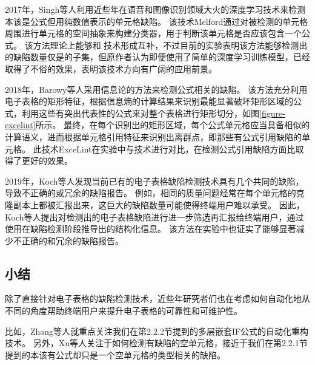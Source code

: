 

2017年，Singh等人\cite{singh2017melford}利用近些年在语音和图像识别领域大火的深度学习技术来检测本该是公式但用纯数值表示的单元格缺陷。
该技术Melford通过对被检测的单元格周围进行单元格的空间抽象来构建分类器，用于判断该单元格是否应该包含一个公式。
该方法理论上能够和 \cu 技术形成互补，不过目前的实验表明该方法能够检测出的缺陷数量仅是\cu 的子集，但原作者认为即便使用了简单的深度学习训练模型，已经取得了不俗的效果，表明该技术方向有广阔的应用前景。

2018年，Barowy等人\cite{Barowy2018excelint}采用信息论的方法来检测公式相关的缺陷。
该方法充分利用电子表格的矩形特征，根据信息熵的计算结果来识别最能显著破坏矩形区域的公式，利用这些有突出代表性的公式来对整个表格进行矩形切分，如图\ref{figure-excelint}所示。
最终，在每个识别出的矩形区域，每个公式单元格应当具备相似的计算语义，进而根据单元格引用特征来识别出离群点，即那些有公式引用缺陷的单元格。
此技术ExceLint在实验中\cite{Barowy2018excelint}与\cu 技术进行对比，在检测公式引用缺陷方面比\cu 取得了更好的效果。

2019年，Koch等人\cite{koch2019refinement}发现当前已有的电子表格缺陷检测技术具有几个共同的缺陷，导致不正确的或冗余的缺陷报告。
例如，相同的质量问题经常在每个单元格的克隆副本上都被汇报出来，这巨大的缺陷数量可能使得终端用户难以承受。
因此，Koch等人提出对检测出的电子表格缺陷进行进一步筛选再汇报给终端用户，通过使用在缺陷检测阶段推导出的结构化信息。
该方法在实验中也证实了能够显著减少不正确的和冗余的缺陷报告。

\subsection{小结}
除了直接针对电子表格的缺陷检测技术，近些年研究者们也在考虑如何自动化地从不同的角度帮助终端用户来提升电子表格的可靠性和可维护性。

比如，Zhang等人\cite{zhang2018automated}就重点关注我们在第2.2.2节提到的多层嵌套IF公式的自动化重构技术。
另外，Xu等人\cite{xu2018detecting}关注于如何检测有缺陷的空单元格，接近于我们在第2.2.1节提到的本该有公式却只是一个空单元格的类型相关的缺陷。




